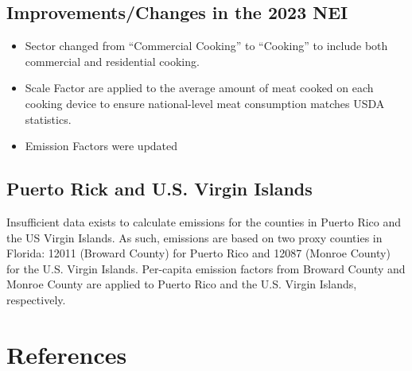 \documentclass[
  11pt,
  oneside]{book}
\providecommand{\tightlist}{%
  \setlength{\itemsep}{0pt}\setlength{\parskip}{0pt}}
\begin{document}
\subsection{Improvements/Changes in the 2023 NEI}\label{improvementschanges-in-the-2023-nei}

\begin{itemize}
\tightlist
\item
  Sector changed from ``Commercial Cooking'' to ``Cooking'' to include both commercial and residential cooking.
\item
  Scale Factor are applied to the average amount of meat cooked on each cooking device to ensure national-level meat consumption matches USDA statistics.
\item
  Emission Factors were updated
\end{itemize}

\subsection{Puerto Rick and U.S. Virgin Islands}\label{puerto-rick-and-u.s.-virgin-islands}

Insufficient data exists to calculate emissions for the counties in Puerto Rico and the US Virgin Islands. As such, emissions are based on two proxy counties in Florida: 12011 (Broward County) for Puerto Rico and 12087 (Monroe County) for the U.S. Virgin Islands. Per-capita emission factors from Broward County and Monroe County are applied to Puerto Rico and the U.S. Virgin Islands, respectively.

\section{References}\label{cooking-references}
\end{document}
